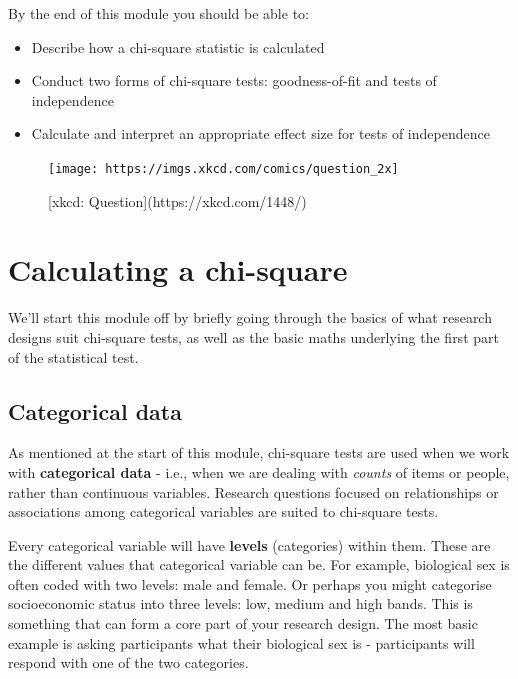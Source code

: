 \documentclass[
]{book}
\providecommand{\tightlist}{%
  \setlength{\itemsep}{0pt}\setlength{\parskip}{0pt}}
\begin{document}
By the end of this module you should be able to:

\begin{itemize}
\tightlist
\item
  Describe how a chi-square statistic is calculated
\item
  Conduct two forms of chi-square tests: goodness-of-fit and tests of independence
\item
  Calculate and interpret an appropriate effect size for tests of independence
\end{itemize}

\begin{figure}

{\centering \texttt{[image: https://imgs.xkcd.com/comics/question\_2x]} 

}

\caption{[xkcd: Question](https://xkcd.com/1448/)}\label{fig:unnamed-chunk-107}
\end{figure}

\section{Calculating a chi-square}\label{calculating-a-chi-square}

We'll start this module off by briefly going through the basics of what research designs suit chi-square tests, as well as the basic maths underlying the first part of the statistical test.

\subsection{Categorical data}\label{categorical-data}

As mentioned at the start of this module, chi-square tests are used when we work with \textbf{categorical data} - i.e., when we are dealing with \emph{counts} of items or people, rather than continuous variables. Research questions focused on relationships or associations among categorical variables are suited to chi-square tests.

Every categorical variable will have \textbf{levels} (categories) within them. These are the different values that categorical variable can be. For example, biological sex is often coded with two levels: male and female. Or perhaps you might categorise socioeconomic status into three levels: low, medium and high bands. This is something that can form a core part of your research design. The most basic example is asking participants what their biological sex is - participants will respond with one of the two categories.
\end{document}
